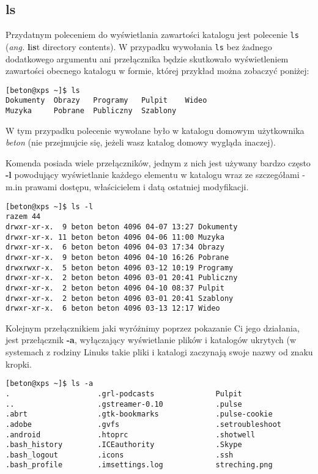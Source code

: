 \subsection{ls}
\label{sec:ls}
Przydatnym poleceniem do wyświetlania zawartości katalogu jest polecenie \texttt{ls} (\textit{ang.} \textbf{l}i\textbf{s}t directory contents). W przypadku wywołania \texttt{ls} bez żadnego dodatkowego argumentu ani przełącznika będzie skutkowało wyświetleniem zawartości obecnego katalogu w formie, której przykład można zobaczyć poniżej:
\begin{verbatim}
[beton@xps ~]$ ls
Dokumenty  Obrazy   Programy   Pulpit    Wideo
Muzyka     Pobrane  Publiczny  Szablony
\end{verbatim}
W tym przypadku polecenie wywołane było w katalogu domowym użytkownika \textit{beton} (nie przejmujcie się, jeżeli wasz katalog domowy wygląda inaczej). \newline

Komenda posiada wiele przełączników, jednym z nich jest używany bardzo często \textbf{-l} powodujący wyświetlanie każdego elementu w katalogu wraz ze szczegółami - m.in prawami dostępu, właścicielem i datą ostatniej modyfikacji.
\begin{verbatim}
[beton@xps ~]$ ls -l
razem 44
drwxr-xr-x.  9 beton beton 4096 04-07 13:27 Dokumenty
drwxr-xr-x. 11 beton beton 4096 04-06 11:00 Muzyka
drwxr-xr-x.  6 beton beton 4096 04-03 17:34 Obrazy
drwxr-xr-x.  9 beton beton 4096 04-10 16:26 Pobrane
drwxrwxr-x.  5 beton beton 4096 03-12 10:19 Programy
drwxr-xr-x.  2 beton beton 4096 03-01 20:41 Publiczny
drwxr-xr-x.  2 beton beton 4096 04-10 08:37 Pulpit
drwxr-xr-x.  2 beton beton 4096 03-01 20:41 Szablony
drwxr-xr-x.  6 beton beton 4096 03-13 12:17 Wideo
\end{verbatim}
Kolejnym przełącznikiem jaki wyróżnimy poprzez pokazanie Ci jego działania, jest przełącznik \textbf{-a}, wyłączający wyświetlanie plików i katalogów ukrytych (w systemach z rodziny Linuks takie pliki i katalogi zaczynają swoje nazwy od znaku kropki.
\begin{verbatim}
[beton@xps ~]$ ls -a
.                    .grl-podcasts              Pulpit
..                   .gstreamer-0.10            .pulse
.abrt                .gtk-bookmarks             .pulse-cookie
.adobe               .gvfs                      .setroubleshoot
.android             .htoprc                    .shotwell
.bash_history        .ICEauthority              .Skype
.bash_logout         .icons                     .ssh
.bash_profile        .imsettings.log            streching.png
\end{verbatim}
